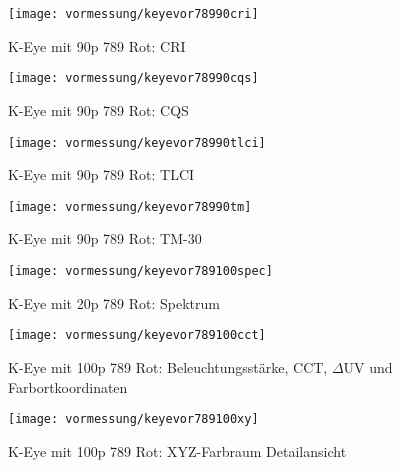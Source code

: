 \documentclass[pagesize,paper=A4,fontsize=12pt,utf8,numbers=noenddot,bibliography=totoc,listof=totoc,DIV=11,BCOR=1mm]{scrreprt}
\begin{document}
\begin{figure}[htp]     %
\centering
\texttt{[image: vormessung/keyevor78990cri]} 
\caption {K-Eye mit 90p 789 Rot: CRI} 
\end{figure}

\begin{figure}[htp]     %
\centering
\texttt{[image: vormessung/keyevor78990cqs]} 
\caption {K-Eye mit 90p 789 Rot: CQS} 
\end{figure}

\begin{figure}[htp]     %
\centering
\texttt{[image: vormessung/keyevor78990tlci]} 
\caption {K-Eye mit 90p 789 Rot: TLCI} 
\end{figure}

\begin{figure}[htp]     %
\centering
\texttt{[image: vormessung/keyevor78990tm]} 
\caption {K-Eye mit 90p 789 Rot: TM-30} 
\end{figure}




\begin{figure}[htp]     %
\centering
\texttt{[image: vormessung/keyevor789100spec]} 
\caption {K-Eye mit 20p 789 Rot: Spektrum} 
\end{figure}

\begin{figure}[htp]     %
\centering
\texttt{[image: vormessung/keyevor789100cct]} 
\caption {K-Eye mit 100p 789 Rot: Beleuchtungsstärke, CCT, $\Delta$UV und Farbortkoordinaten} 
\end{figure}

\begin{figure}[htp]     %
\centering
\texttt{[image: vormessung/keyevor789100xy]} 
\caption {K-Eye mit 100p 789 Rot: XYZ-Farbraum Detailansicht} 
\end{figure}
\end{document}
